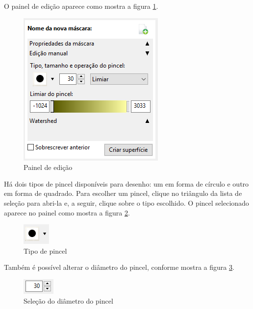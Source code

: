 O painel de edição aparece como mostra a figura \ref{fig:edition_slices_ref}.

\begin{figure}[!htb]
\centering
\includegraphics[scale=0.6]{../user_guide_figures/invesalius_screen/segmentation_manual_window_pt.png}
\caption{Painel de edição}
\label{fig:edition_slices_ref}
\end{figure}

Há dois tipos de pincel disponíveis para desenho: um em forma de círculo e outro em forma
de quadrado. Para escolher um pincel, clique no triângulo da lista de seleção para abri-la
e, a seguir, clique sobre o tipo escolhido. O pincel selecionado aparece no painel como
mostra a figura \ref{fig:brush_type}.

\begin{figure}[!htb]
\centering
\includegraphics[scale=0.9]{../user_guide_figures/invesalius_screen/segmentation_manual_pencil_type.png}
\caption{Tipo de pincel}
\label{fig:brush_type}
\end{figure}

\newpage

Também é possível alterar o diâmetro do pincel, conforme mostra a figura \ref{fig:select_diameter}.

\begin{figure}[!htb]
\centering
\includegraphics[scale=0.8]{../user_guide_figures/invesalius_screen/segmentation_manual_diameter.png}
\caption{Seleção do diâmetro do pincel}
\label{fig:select_diameter}
\end{figure}

